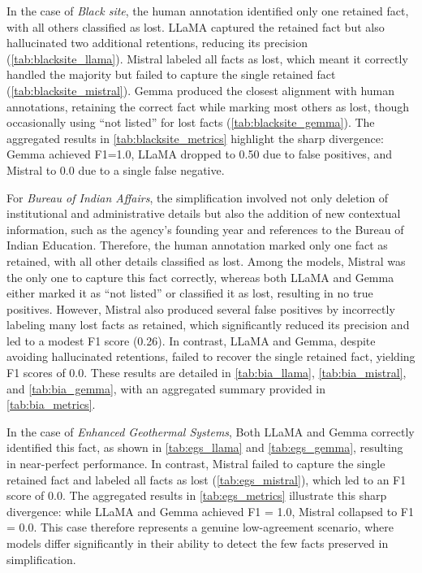 \documentclass{DESSThesis}
\begin{document}
In the case of \textit{Black site}, the human annotation identified only one retained fact, with all others classified as lost. LLaMA captured the retained fact but also hallucinated two additional retentions, reducing its precision (\autoref{tab:blacksite_llama}). Mistral labeled all facts as lost, which meant it correctly handled the majority but failed to capture the single retained fact (\autoref{tab:blacksite_mistral}). Gemma produced the closest alignment with human annotations, retaining the correct fact while marking most others as lost, though occasionally using “not listed” for lost facts (\autoref{tab:blacksite_gemma}). The aggregated results in \autoref{tab:blacksite_metrics} highlight the sharp divergence: Gemma achieved F1=1.0, LLaMA dropped to 0.50 due to false positives, and Mistral to 0.0 due to a single false negative.

For \textit{Bureau of Indian Affairs}, the simplification involved not only deletion of institutional and administrative details but also the addition of new contextual information, such as the agency’s founding year and references to the Bureau of Indian Education. Therefore, the human annotation marked only one fact as retained, with all other details classified as lost. Among the models, Mistral was the only one to capture this fact correctly, whereas both LLaMA and Gemma either marked it as “not listed” or classified it as lost, resulting in no true positives. However, Mistral also produced several false positives by incorrectly labeling many lost facts as retained, which significantly reduced its precision and led to a modest F1 score (0.26). In contrast, LLaMA and Gemma, despite avoiding hallucinated retentions, failed to recover the single retained fact, yielding F1 scores of 0.0. These results are detailed in \autoref{tab:bia_llama}, \autoref{tab:bia_mistral}, and \autoref{tab:bia_gemma}, with an aggregated summary provided in \autoref{tab:bia_metrics}.

In the case of \textit{Enhanced Geothermal Systems}, Both LLaMA and Gemma correctly identified this fact, as shown in \autoref{tab:egs_llama} and \autoref{tab:egs_gemma}, resulting in near-perfect performance. In contrast, Mistral failed to capture the single retained fact and labeled all facts as lost (\autoref{tab:egs_mistral}), which led to an F1 score of 0.0. The aggregated results in \autoref{tab:egs_metrics} illustrate this sharp divergence: while LLaMA and Gemma achieved F1 = 1.0, Mistral collapsed to F1 = 0.0. This case therefore represents a genuine low-agreement scenario, where models differ significantly in their ability to detect the few facts preserved in simplification.
\end{document}
